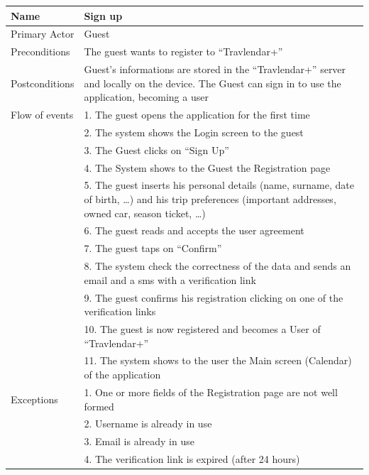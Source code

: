 \begin{center}
\def\arraystretch{1.25}
  \begin{tabular}{ | l | p{} | }
    \hline
    Name & Sign up \\ \hline
    Primary Actor & Guest \\ \hline
    Preconditions & The guest wants to register to “Travlendar+” \\ \hline
    Postconditions & Guest's informations are stored in the “Travlendar+” server and locally on the device. The Guest can sign in to use the application, becoming a user \\ \hline
    Flow of events  & 1.	The guest opens the application for the first time \\
					& 2.	The system shows the Login screen to the guest \\
					& 3.	The Guest clicks on “Sign Up” \\
					& 4.	The System shows to the Guest the Registration page \\
					& 5.	The guest inserts his personal details (name, surname, date of birth, …) and his trip preferences (important addresses, owned car, season ticket, …) \\
					& 6.	The guest reads and accepts the user agreement \\
					& 7.	The guest taps on “Confirm” \\
					& 8.	The system check the correctness of the data and sends an email and a sms with a verification link \\
					& 9.	The guest confirms his registration clicking on one of the verification links \\
					& 10.	The guest is now registered and becomes a User of “Travlendar+” \\
					& 11.	The system shows to the user the Main screen (Calendar) of the application \\ \hline    
    Exceptions  & 1.	One or more fields of the Registration page are not well formed \\
				& 2.	Username is already in use \\
				& 3.	Email is already in use \\
				& 4.	The verification link is expired (after 24 hours)\\ \hline
  \end{tabular}
\end{center}

